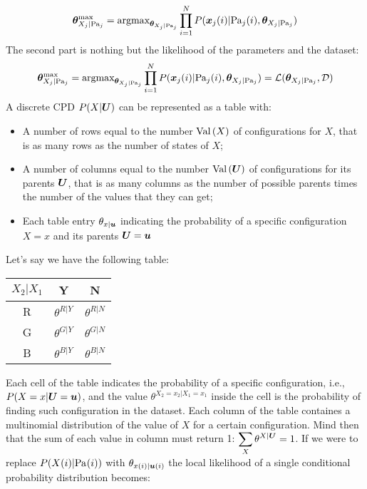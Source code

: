 \[\bm{\theta}^{\text{max}}_{X_j\vert\text{Pa}_{j}}=\text{argmax}_{\bm{\theta}_{X_j\vert \text{Pa}_{j}}}\displaystyle\prod_{i=1}^NP(\bm{x}_j(i)\vert \text{Pa}_{j}(i),\bm{\theta}_{X_j\vert\text{Pa}_{j}})\]
The second part is nothing but the likelihood of the parameters and the dataset: 
\[\bm{\theta}^{\text{max}}_{X_j\vert\text{Pa}_{j}}=\text{argmax}_{\bm{\theta}_{X_j\vert \text{Pa}_{j}}}\displaystyle\prod_{i=1}^NP(\bm{x}_j(i)\vert \text{Pa}_{j}(i),\bm{\theta}_{X_j\vert\text{Pa}_{j}})=\mathcal{L}(\bm{\theta}_{X_j\vert\text{Pa}_{j}},\mathcal{D})\]
A discrete CPD $P(X\vert \bm{U})$ can be represented as a table with:
\begin{itemize}
  \item A number of rows equal to the number $\text{Val}\left({X}\right)$ of configurations for $X$, that is as many rows as the number of states of $X$;
  \item A number of columns equal to the number $\text{Val}\left({\bm{U}}\right)$ of configurations for its parents $\bm{U}$, that is as many columns as the number of possible parents times the number of the values that they can get;
  \item Each table entry $\theta_{x\vert\bm{u}}$ indicating the probability of a specific configuration $X=x$ and its parents $\bm{U}=\bm{u}$
\end{itemize}
Let's say we have the following table:
\begin{center}
  \begin{tabular}{c|c|c}
    $X_2\vert X_1$&Y &N\\
    \hline
    R             &$\theta^{R\vert Y}$&$\theta^{R\vert N}$\\
    \hline
    G             &$\theta^{G\vert Y}$&$\theta^{G\vert N}$\\
    \hline
    B             &$\theta^{B\vert Y}$&$\theta^{B\vert N}$\\
  \end{tabular}
\end{center}
Each cell of the table indicates the probability of a specific configuration, i.e., $P(X=x\vert\bm{U}=\bm{u})$, and the value $\theta^{X_2=x_2\vert X_1=x_1}$ inside the cell is the probability of finding such configuration in the dataset. Each column of the table containes a multinomial distribution of the value of $X$ for a certain configuration. Mind then that the sum of each value in column must return 1: $\displaystyle\sum_X\theta^{X\vert\bm{U}}=1$. \newline
If we were to replace $P(X(i)\vert\text{Pa}_{}(i))$ with $\theta_{x(i)\vert\bm{u}(i)}$ the local likelihood of a single conditional probability distribution becomes:
